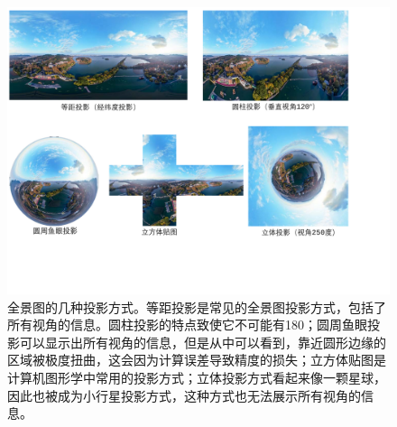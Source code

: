 \begin{figure}[!htbp]
    \centering
    \includegraphics[width=1.0\textwidth]{Img/panorama-projection.pdf}

    \caption[全景图的几种投影方式]
    {
        \label{fig:panorama-projection}
        全景图的几种投影方式。等距投影是常见的全景图投影方式，包括了所有视角的信息。圆柱投影的特点致使它不可能有180；圆周鱼眼投影可以显示出所有视角的信息，但是从中可以看到，靠近圆形边缘的区域被极度扭曲，这会因为计算误差导致精度的损失；立方体贴图是计算机图形学中常用的投影方式；立体投影方式看起来像一颗星球，因此也被成为小行星投影方式，这种方式也无法展示所有视角的信息。
    }
\end{figure}
